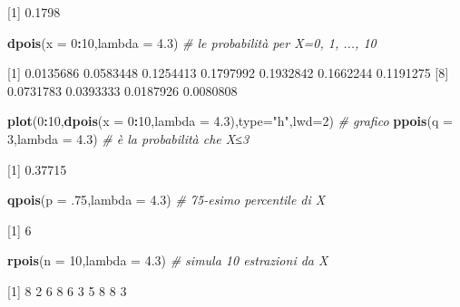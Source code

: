 \documentclass[
  11pt,
]{book}
\newenvironment{Shaded}{\begin{snugshade}}{\end{snugshade}}
\newcommand{\AttributeTok}[1]{\textcolor[rgb]{0.13,0.29,0.53}{#1}}
\newcommand{\CommentTok}[1]{\textcolor[rgb]{0.56,0.35,0.01}{\textit{#1}}}
\newcommand{\DecValTok}[1]{\textcolor[rgb]{0.00,0.00,0.81}{#1}}
\newcommand{\FloatTok}[1]{\textcolor[rgb]{0.00,0.00,0.81}{#1}}
\newcommand{\FunctionTok}[1]{\textcolor[rgb]{0.13,0.29,0.53}{\textbf{#1}}}
\newcommand{\NormalTok}[1]{#1}
\newcommand{\SpecialCharTok}[1]{\textcolor[rgb]{0.81,0.36,0.00}{\textbf{#1}}}
\newcommand{\StringTok}[1]{\textcolor[rgb]{0.31,0.60,0.02}{#1}}
\theoremstyle{mytheoremstyle}
\theoremstyle{mydefstyle}
\begin{document}
{[}1{]} 0.1798

\begin{Shaded}
\begin{Highlighting}[]
\FunctionTok{dpois}\NormalTok{(}\AttributeTok{x =} \DecValTok{0}\SpecialCharTok{:}\DecValTok{10}\NormalTok{,}\AttributeTok{lambda =} \FloatTok{4.3}\NormalTok{) }\CommentTok{\#  le probabilità per X=0, 1, ..., 10}
\end{Highlighting}
\end{Shaded}

{[}1{]} 0.0135686 0.0583448 0.1254413 0.1797992 0.1932842 0.1662244 0.1191275
{[}8{]} 0.0731783 0.0393333 0.0187926 0.0080808

\begin{Shaded}
\begin{Highlighting}[]
\FunctionTok{plot}\NormalTok{(}\DecValTok{0}\SpecialCharTok{:}\DecValTok{10}\NormalTok{,}\FunctionTok{dpois}\NormalTok{(}\AttributeTok{x =} \DecValTok{0}\SpecialCharTok{:}\DecValTok{10}\NormalTok{,}\AttributeTok{lambda =} \FloatTok{4.3}\NormalTok{),}\AttributeTok{type=}\StringTok{"h"}\NormalTok{,}\AttributeTok{lwd=}\DecValTok{2}\NormalTok{) }\CommentTok{\# grafico}
\FunctionTok{ppois}\NormalTok{(}\AttributeTok{q =} \DecValTok{3}\NormalTok{,}\AttributeTok{lambda =} \FloatTok{4.3}\NormalTok{) }\CommentTok{\# è la probabilità che X≤3}
\end{Highlighting}
\end{Shaded}

{[}1{]} 0.37715

\begin{Shaded}
\begin{Highlighting}[]
\FunctionTok{qpois}\NormalTok{(}\AttributeTok{p =}\NormalTok{ .}\DecValTok{75}\NormalTok{,}\AttributeTok{lambda =} \FloatTok{4.3}\NormalTok{) }\CommentTok{\# 75{-}esimo percentile di X}
\end{Highlighting}
\end{Shaded}

{[}1{]} 6

\begin{Shaded}
\begin{Highlighting}[]
\FunctionTok{rpois}\NormalTok{(}\AttributeTok{n =} \DecValTok{10}\NormalTok{,}\AttributeTok{lambda =} \FloatTok{4.3}\NormalTok{)  }\CommentTok{\# simula 10 estrazioni da X}
\end{Highlighting}
\end{Shaded}

{[}1{]} 8 2 6 8 6 3 5 8 8 3
\end{document}
